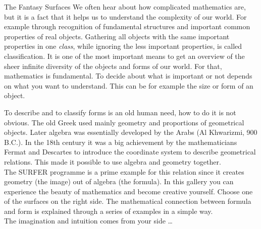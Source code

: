 \begin{surferIntroPage}{The Fantasy Surfaces}
We often hear about how complicated mathematics are, but it is a fact that it helps us to understand the complexity of our world. For example through recognition of fundamental structures and important common properties of real objects. Gathering all objects with the same important properties in one \textit{class}, while ignoring the less important properties, is called classification. It is one of the most important means to get an overview of the sheer infinite diversity of the objects and forms of our world. For that, mathematics is fundamental. To decide about what is important or not depends on what you want to understand. This can be for example the size or form of an object.
\\

\vspace{0.4cm}

To describe and to classify forms is an old human need, how to do it is not obvious. The old Greek used mainly geometry and proportions of geometrical objects. Later algebra was essentially developed by the Arabs (Al Khwarizmi, 900 B.C.). In the 18th century it was a big achievement by the mathematicians Fermat and Descartes to introduce the coordinate system to describe geometrical relations. This made it possible to use algebra and geometry together.
\\
\vspace{0.4cm}
The SURFER programme is a prime example for this relation since it creates geometry (the image) out of algebra (the formula).
In this gallery you can experience the beauty of mathematics and become creative yourself. Choose one of the surfaces on the right side. The mathematical connection between formula and form is explained through a series of examples in a simple way.\\
The imagination and intuition comes from your side \dots
\end{surferIntroPage}
